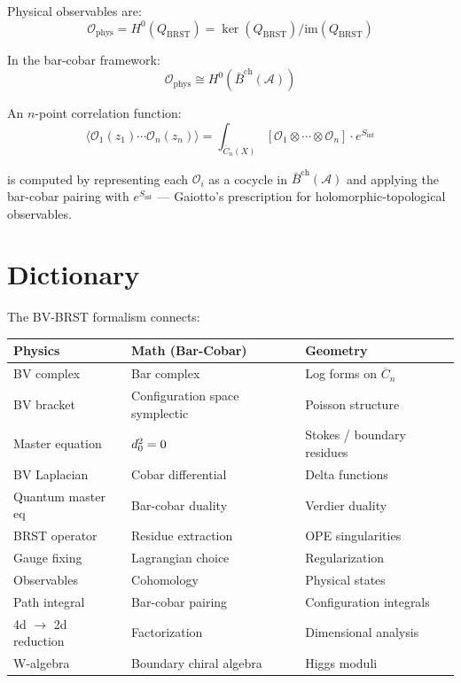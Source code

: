 \begin{theorem}[Observables = cohomology; \ClaimStatusProvedElsewhere{} \cite{CG17}]
\label{thm:observables-brst-cohomology}
Physical observables are:
\[\mathcal{O}_{\text{phys}} = H^0(Q_{\text{BRST}}) = 
\ker(Q_{\text{BRST}})/\text{im}(Q_{\text{BRST}})\]

In the bar-cobar framework:
\[\mathcal{O}_{\text{phys}} \cong H^0(\bar{B}^{\text{ch}}(\mathcal{A}))\]
\end{theorem}

\begin{example}
An $n$-point correlation function:
\[\langle \mathcal{O}_1(z_1) \cdots \mathcal{O}_n(z_n) \rangle = 
\int_{\overline{C}_n(X)} [\mathcal{O}_1 \otimes \cdots \otimes \mathcal{O}_n] 
\cdot e^{S_{\text{int}}}\]

is computed by representing each $\mathcal{O}_i$ as a cocycle in $\bar{B}^{\text{ch}}(\mathcal{A})$ and applying the bar-cobar pairing with $e^{S_{\text{int}}}$ --- Gaiotto's prescription for holomorphic-topological observables.
\end{example}

\section{Dictionary}

\begin{remark}[Dictionary]
The BV-BRST formalism connects:

\begin{center}
\begin{tabular}{|l|l|l|}
\hline
\textbf{Physics} & \textbf{Math (Bar-Cobar)} & \textbf{Geometry} \\
\hline
BV complex & Bar complex & Log forms on $\overline{C}_n$ \\
BV bracket & Configuration space symplectic & Poisson structure \\
Master equation & $d_0^2 = 0$ & Stokes / boundary residues \\
BV Laplacian & Cobar differential & Delta functions \\
Quantum master eq & Bar-cobar duality & Verdier duality \\
BRST operator & Residue extraction & OPE singularities \\
Gauge fixing & Lagrangian choice & Regularization \\
Observables & Cohomology & Physical states \\
Path integral & Bar-cobar pairing & Configuration integrals \\
4d $\to$ 2d reduction & Factorization & Dimensional analysis \\
W-algebra & Boundary chiral algebra & Higgs moduli \\
\hline
\end{tabular}
\end{center}
\end{remark}

